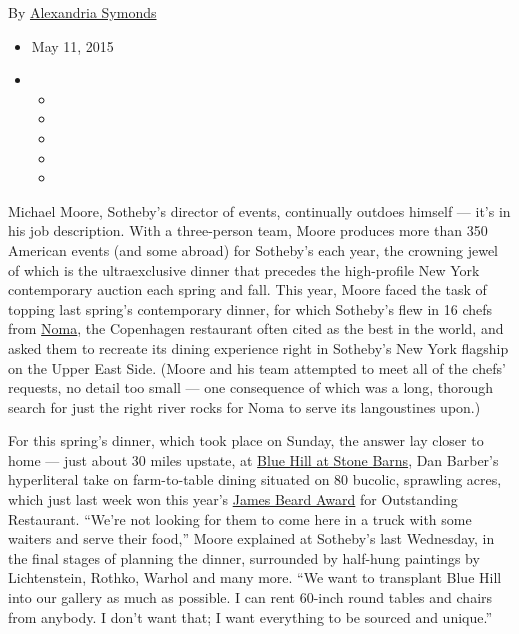 By
\href{http://www.nytimes3xbfgragh.onion/by/alexandria-symonds}{Alexandria
Symonds}

\begin{itemize}
\item
  May 11, 2015
\item
  \begin{itemize}
  \item
  \item
  \item
  \item
  \item
  \end{itemize}
\end{itemize}

Michael Moore, Sotheby's director of events, continually outdoes himself
--- it's in his job description. With a three-person team, Moore
produces more than 350 American events (and some abroad) for Sotheby's
each year, the crowning jewel of which is the ultraexclusive dinner that
precedes the high-profile New York contemporary auction each spring and
fall. This year, Moore faced the task of topping last spring's
contemporary dinner, for which Sotheby's flew in 16 chefs from
\href{http://tmagazine.blogs.nytimes3xbfgragh.onion/2011/11/29/edible-selby-danish-modern/}{Noma},
the Copenhagen restaurant often cited as the best in the world, and
asked them to recreate its dining experience right in Sotheby's New York
flagship on the Upper East Side. (Moore and his team attempted to meet
all of the chefs' requests, no detail too small --- one consequence of
which was a long, thorough search for just the right river rocks for
Noma to serve its langoustines upon.)

For this spring's dinner, which took place on Sunday, the answer lay
closer to home --- just about 30 miles upstate, at
\href{http://tmagazine.blogs.nytimes3xbfgragh.onion/2008/09/26/at-the-table-dan-barbers-radical-evolution/}{Blue
Hill at Stone Barns}, Dan Barber's hyperliteral take on farm-to-table
dining situated on 80 bucolic, sprawling acres, which just last week won
this year's
\href{http://www.jamesbeard.org/blog/2015-james-beard-award-winners}{James
Beard Award} for Outstanding Restaurant. ``We're not looking for them to
come here in a truck with some waiters and serve their food,'' Moore
explained at Sotheby's last Wednesday, in the final stages of planning
the dinner, surrounded by half-hung paintings by Lichtenstein, Rothko,
Warhol and many more. ``We want to transplant Blue Hill into our gallery
as much as possible. I can rent 60-inch round tables and chairs from
anybody. I don't want that; I want everything to be sourced and
unique.''

